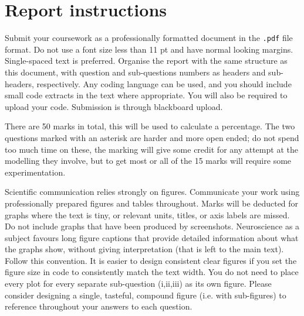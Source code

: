 \documentclass[11pt]{article}
\renewcommand{\thesubsection}{Question \arabic{subsection}\!\!\!}
\begin{document}
\clearpage





\setcounter{subsection}{0}
\renewcommand{\thesubsection}{\Roman{subsection}}
\clearpage
\section*{Report instructions}

Submit your coursework as a professionally formatted document in the \texttt{.pdf} file format. Do not use a font size less than 11 pt and have normal looking margins. Single-spaced text is preferred. Organise the report with the same structure as this document, with question and sub-questions numbers as headers and sub-headers, respectively. Any coding language can be used, and you should include small code extracts in the text where appropriate. You will also be required to upload your code. Submission is through blackboard upload.

There are 50 marks in total, this will be used to calculate a
percentage. The two questions marked with an asterisk are harder and
more open ended; do not spend too much time on these, the marking will
give some credit for any attempt at the modelling they involve, but to
get most or all of the 15 marks will require some experimentation.

Scientific communication relies strongly on figures. Communicate your work using professionally prepared figures and tables throughout. 
Marks will be deducted for graphs where the text is tiny, or relevant units, titles, or axis labels are missed. Do not
include graphs that have been produced by screenshots. 
Neuroscience as a subject favours long figure captions that provide
detailed information about what the graphs show, without giving
interpretation (that is left to the main text). Follow this
convention. It is easier to design consistent clear figures if you set the figure size in code to consistently match the text width.
You do not need to place every plot for every separate sub-question (i,ii,iii) as its own figure. Please consider designing a single, tasteful, compound figure (i.e. with sub-figures) to reference throughout your answers to each question.
\end{document}
